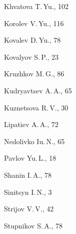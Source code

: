 \begin{theindex}
  \item Khvatova T.\,Yu., 102


  \item Korolev V.\,Yu., 116


  \item Kovalev D.\,Yu., 78


  \item Kovalyov S.\,P., 23


  \item Kruzhkov M.\,G., 86


  \item Kudryavtsev A.\,A., 65


  \item Kuznetsova R.\,V., 30





  \indexspace





  \item Lipatiev A.\,A., 72





  \indexspace





  \item Nedolivko Iu.\,N., 65





  \indexspace





  \item Pavlov Yu.\,L., 18





  \indexspace





  \item Shanin I.\,A., 78


  \item Sinitsyn I.\,N., 3


  \item Strijov V.\,V., 42


  \item Stupnikov S.\,A., 78





  \indexspace






\end{theindex}
